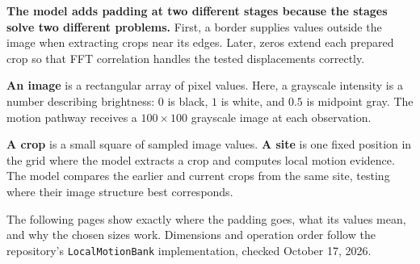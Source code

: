 \documentclass[11pt]{article}
\newcommand{\heading}[2]{\noindent{\color{teal}\small\bfseries #1}\par\vspace{2pt}{\color{navy}\LARGE\bfseries #2}\par\vspace{5pt}}
\newcommand{\term}[1]{\textbf{\color{navy}#1}}
\begin{document}
\heading{1 / THE WHOLE PIPELINE}{Why the model pads twice}
\textbf{The model adds padding at two different stages because the stages solve two different problems.} First, a border supplies values outside the image when extracting crops near its edges. Later, zeros extend each prepared crop so that FFT correlation handles the tested displacements correctly.

\term{An image} is a rectangular array of pixel values. Here, a grayscale intensity is a number describing brightness: $0$ is black, $1$ is white, and $0.5$ is midpoint gray. The motion pathway receives a $100\times100$ grayscale image at each observation.

\begin{center}
\end{center}
\term{A crop} is a small square of sampled image values. \term{A site} is one fixed position in the grid where the model extracts a crop and computes local motion evidence. The model compares the earlier and current crops from the same site, testing where their image structure best corresponds.

The following pages show exactly where the padding goes, what its values mean, and why the chosen sizes work. Dimensions and operation order follow the repository's \texttt{LocalMotionBank} implementation, checked October 17, 2026.
\end{document}
